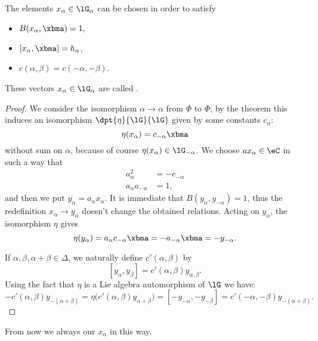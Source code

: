 \begin{corollary}
The elements $ x_{\alpha}\in\lG_{\alpha}$ can be chosen in order to satisfy

\begin{itemize}
\item $B( x_{\alpha},\xbma)=1,$
\item $[ x_{\alpha},\xbma]= h_{\alpha}$,
\item $c(\alpha,\beta)=c(-\alpha,-\beta)$.
\end{itemize}

\end{corollary}

These vectors $ x_{\alpha}\in\lG_{\alpha}$ are called .

\begin{proof}
We consider the isomorphism $\alpha\to\alpha$ from $\Phi$ to $\Phi$; by the theorem this induces an isomorphism $\dpt{\eta}{\lG}{\lG}$ given by some constants $c_{\alpha}$:
\[
\eta( x_{\alpha})=c_{-\alpha}\xbma
\]
without sum on $\alpha$, because of course $\eta( x_{\alpha})\in\lG_{-\alpha}$. We choose $a x_{\alpha}\in\eC$ in such a way that
\begin{subequations}
\begin{align}
a_{\alpha}^2&=-c_{-\alpha}\\
a_{\alpha} a_{-\alpha}&=1,
\end{align}
\end{subequations}
and then we put $y_{\alpha}=a_{\alpha} x_{\alpha}$. It is immediate that $B(y_{\alpha},y_{-\alpha})=1$, thus the redefinition $ x_{\alpha}\to y_{\alpha}$ doesn't change the obtained relations. Acting on $y_{\alpha}$, the isomorphism $\eta$ gives
\begin{equation}
\eta(y_{\alpha})=a_{\alpha} c_{-\alpha}\xbma
=-a_{-\alpha}\xbma
=-y_{-\alpha}.
\end{equation}

If $\alpha,\beta,\alpha+\beta\in\Delta$, we naturally define $c'(\alpha,\beta)$ by
\[
[y_{\alpha},y_{\beta}]=c'(\alpha,\beta)y_{\alpha,\beta}.
\]
Using the fact that $\eta$ is a Lie algebra automorphism of $\lG$ we have:
\begin{equation}
-c'(\alpha,\beta)y_{-(\alpha+\beta)}=\eta\big(  c'(\alpha,\beta)y_{\alpha+\beta}   \big)
            =[-y_{-\alpha},-y_{-\beta}]
            =c'(-\alpha,-\beta)y_{-(\alpha+\beta)}.
\end{equation}
\end{proof}

From now we always our $ x_{\alpha}$ in this way.

